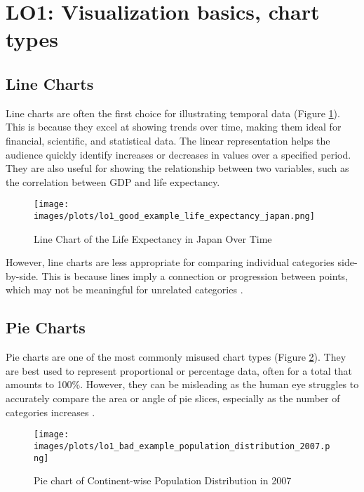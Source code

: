 \section{LO1: Visualization basics, chart types}

\subsection{Line Charts}

Line charts are often the first choice for illustrating temporal data (Figure \ref{fig:line_chart_good}). This is because they excel at showing trends over time, making them ideal for financial, scientific, and statistical data. The linear representation helps the audience quickly identify increases or decreases in values over a specified period. They are also useful for showing the relationship between two variables, such as the correlation between GDP and life expectancy.

\begin{figure}[h]
    \centering
    \texttt{[image: images/plots/lo1\_good\_example\_life\_expectancy\_japan.png]}
    \caption{Line Chart of the Life Expectancy in Japan Over Time}
    \label{fig:line_chart_good}
\end{figure}

However, line charts are less appropriate for comparing individual categories side-by-side. This is because lines imply a connection or progression between points, which may not be meaningful for unrelated categories \cite{fewNowYouSee2009}.

\subsection{Pie Charts}

Pie charts are one of the most commonly misused chart types (Figure \ref{fig:pie_chart_bad}). They are best used to represent proportional or percentage data, often for a total that amounts to 100\%. However, they can be misleading as the human eye struggles to accurately compare the area or angle of pie slices, especially as the number of categories increases \cite{tufteVisualDisplayQuantitative2015}.

\begin{figure}[h]
    \centering
    \texttt{[image: images/plots/lo1\_bad\_example\_population\_distribution\_2007.png]}
    \caption{Pie chart of Continent-wise Population Distribution in 2007}
    \label{fig:pie_chart_bad}
\end{figure}


